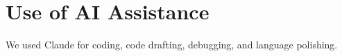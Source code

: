 \section{Use of AI Assistance}
We used Claude for coding, code drafting, debugging, and language polishing.
